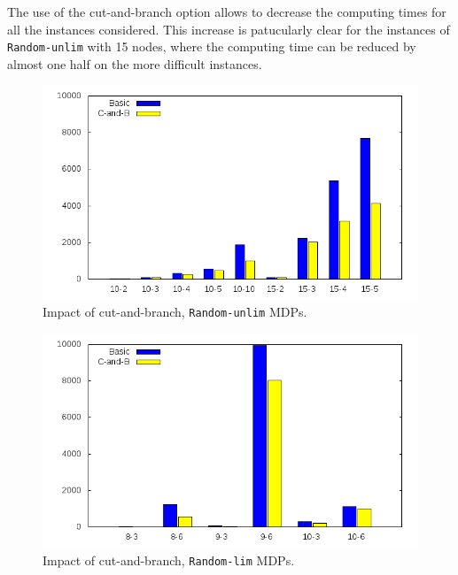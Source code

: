 The use of the cut-and-branch option allows to decrease the computing times for all the instances considered. This increase is patucularly clear for the instances of \texttt{Random-unlim} with 15 nodes, where the computing time can be reduced by almost one half on the more difficult instances.

\begin{figure}[]
	\begin{center}
    \includegraphics[scale=0.45]{GNUPLOT/output_random.png}
	\end{center}
	\caption{Impact of cut-and-branch, \texttt{Random-unlim} MDPs.}
	\label{fig:impact_random} 
\end{figure}

\begin{figure}[]
	\begin{center}
    \includegraphics[scale=0.45]{GNUPLOT/output_trident.png}
	\end{center}
	\caption{Impact of cut-and-branch, \texttt{Random-lim} MDPs.}
	\label{fig:impact_trident} 
\end{figure}
